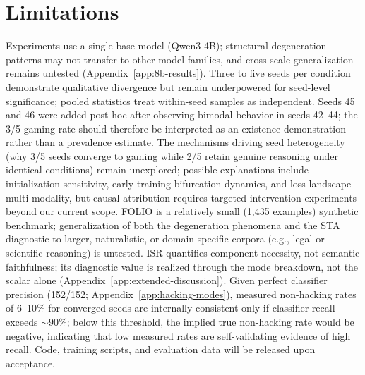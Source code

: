\section{Limitations}
\label{sec:limitations}

Experiments use a single base model (Qwen3-4B); structural degeneration patterns may not transfer to other model families, and cross-scale generalization remains untested (Appendix~\ref{app:8b-results}).
Three to five seeds per condition demonstrate qualitative divergence but remain underpowered for seed-level significance; pooled statistics treat within-seed samples as independent.
Seeds 45 and 46 were added post-hoc after observing bimodal behavior in seeds 42--44; the 3/5 gaming rate should therefore be interpreted as an existence demonstration rather than a prevalence estimate.
The mechanisms driving seed heterogeneity (why 3/5 seeds converge to gaming while 2/5 retain genuine reasoning under identical conditions) remain unexplored; possible explanations include initialization sensitivity, early-training bifurcation dynamics, and loss landscape multi-modality, but causal attribution requires targeted intervention experiments beyond our current scope.
FOLIO is a relatively small (1,435 examples) synthetic benchmark; generalization of both the degeneration phenomena and the STA diagnostic to larger, naturalistic, or domain-specific corpora (e.g., legal or scientific reasoning) is untested.
ISR quantifies component necessity, not semantic faithfulness; its diagnostic value is realized through the mode breakdown, not the scalar alone (Appendix~\ref{app:extended-discussion}).
Given perfect classifier precision (152/152; Appendix~\ref{app:hacking-modes}), measured non-hacking rates of 6--10\% for converged seeds are internally consistent only if classifier recall exceeds ${\sim}90\%$; below this threshold, the implied true non-hacking rate would be negative, indicating that low measured rates are self-validating evidence of high recall.
Code, training scripts, and evaluation data will be released upon acceptance.
